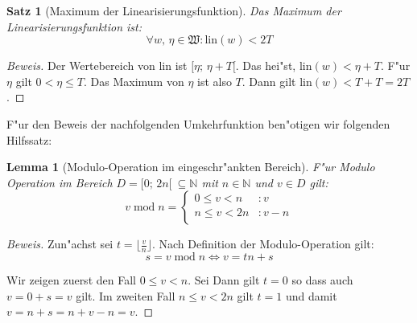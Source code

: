 \documentclass[a4paper]{article}
\newcommand*{\linf}{\mathrm{lin}}
\newcommand*{\wkdays}{\mathfrak{W}}
\renewcommand{\mod}{\;\mathrm{mod}\;}
\numberwithin{equation}{section}
\newtheorem{thm}{Satz}
\newtheorem{lmm}{Lemma}
\begin{document}
\begin{thm}[Maximum der Linearisierungsfunktion]\label{thm:maxLin}
  Das Maximum der Linearisierungsfunktion ist:
  \begin{equation}\forall w,\,\eta \in \wkdays : \linf(w) < 2T\end{equation}
\end{thm}
\begin{proof}[Beweis]
  Der Wertebereich von $\linf$ ist $[\eta;\,\eta + T[$. Das hei"st,
  $\linf(w) < \eta + T$. F"ur $\eta$ gilt $0 < \eta \le T$. Das Maximum von
  $\eta$ ist also $T$. Dann gilt $\linf(w) < T + T = 2T$.
\end{proof}

F"ur den Beweis der nachfolgenden Umkehrfunktion ben"otigen wir folgenden
Hilfssatz:
\begin{lmm}[Modulo-Operation im eingeschr"ankten Bereich]\label{lmm:modulo}
  F"ur Modulo Operation im Bereich $D = [0;\,2n[\ \subseteq \mathbb{N}$ mit
  $n \in \mathbb{N}$ und $v \in D$ gilt:
  \begin{equation}
    v \mod n = \left\{\begin{array}{ll}
        0 \le v < n & : v \\
        n \le v < 2n & : v - n \\
      \end{array}\right.
  \end{equation}
\end{lmm}
\begin{proof}[Beweis]
  Zun"achst sei $t = \lfloor\frac{v}{n}\rfloor$. Nach Definition der
  Modulo-Operation gilt:
  \begin{equation}s = v \mod n \Longleftrightarrow v = tn + s\end{equation}

  \noindent Wir zeigen zuerst den Fall $0 \le v < n$. Sei Dann gilt $t = 0$ so
  dass auch $v = 0 + s = v$ gilt. Im zweiten Fall $n \le v < 2n$ gilt $t = 1$
  und damit $v = n + s = n + v - n = v$.
\end{proof}
\end{document}
